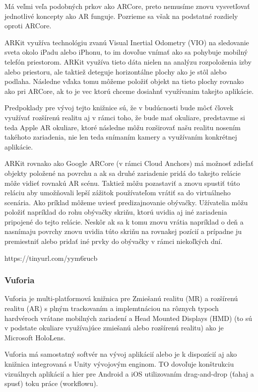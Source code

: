 Má veľmi veľa podobných prkov ako ARCore, preto nemusíme znovu vysvetľovať jednotlivé koncepty ako AR funguje. Pozrieme sa však na podstatné rozdiely oproti ARCore.

ARKit využíva technológiu zvanú Visual Inertial Odometry (VIO) na sledovanie sveta okolo iPadu alebo iPhonu, to im dovoľue vnímať ako sa pohybuje mobilný telefón priestorom. ARKit využíva tieto dáta nielen na analýzu rozpoloženia izby alebo priestoru, ale taktiež deteguje horizontálne plochy ako je stôl alebo podlaha. Následne vďaka tomu môžeme položiť objekt na tieto plochy rovnako ako pri ARCore, ak to je vec ktorú chceme dosiahnť využívanim takejto aplikácie.

Predpoklady pre vývoj tejto knižnice sú, že v budúcnosti bude môcť človek využívať rozšírenú realitu aj v rámci toho, že bude mať okuliare, predstavme si teda Apple AR okuliare, ktoré následne môžu rozširovať našu realitu nosením takéhoto zariadenia, nie len teda snímaním kamery a využívaním konkrétnej aplikácie.

ARKit rovnako ako Google ARCore (v rámci Cloud Anchors) má možnosť zdieľať objekty položené na povrchu a ak sa druhé zariadenie pridá do takejto relácie môže vidieť rovnakú AR scénu. Taktiež môžu pozastaviť a znovu spustiť túto reláciu aby umožňovali lepší zážitok používateľom vrátiť sa do virtuálneho scenária. Ako príklad môžeme uviesť predizajnovanie obývačky. Užívatelia môžu položiť napríklad do rohu obývačky skriňu, ktorú uvidia aj iné zariadenia pripojené do tejto relácie. Neskôr ak sa k tomu znovu vrátia napríklad o deň a nasnímaju povrchy znovu uvidia túto skriňu na rovnakej pozícií a prípadne ju premiestniť alebo pridať iné prvky do obývačky v rámci niekoľkých dní.

https://tinyurl.com/yym6rucb

\subsubsection{Vuforia}

Vuforia je multi-platformová knižnica pre Zmiešanú realitu (MR) a rozšírenú realitu (AR) s plným trackovaním a implemtnáciou na rôznych typoch hardvéroch vrátane mobilných zariadení a Head Mounted Displays (HMD) (to sú v podstate okuliare využívajúce zmiešanú alebo rozšírenú realitu) ako je Microsoft HoloLens.

Vuforia má samostatný softvér na vývoj aplikácií alebo je k dispozícií aj ako knižnica integrovaná s Unity vývojovým enginom. TO dovoľuje konštrukciu vizuálnych aplikácií a hier pre Android a iOS utilizovaním drag-and-drop (ťahaj a spusť) toku práce (workflowu).

